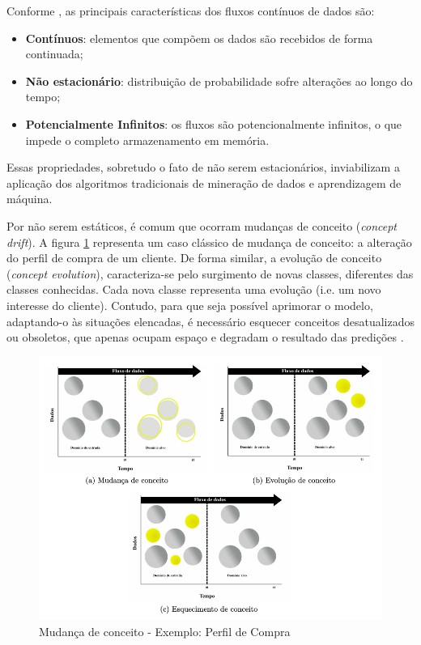 \documentclass[qual, classic, a4paper]{ufbathesis}
\begin{document}
Conforme \cite{Gama:2014:survey}, as principais características dos fluxos contínuos de dados são:

\begin{itemize}
    \item \textbf{Contínuos}: elementos que compõem os dados são recebidos de forma continuada;

    \item \textbf{Não estacionário}: distribuição de probabilidade sofre alterações ao longo do tempo;

    \item \textbf{Potencialmente Infinitos}: os fluxos são potencionalmente infinitos, o que impede o completo armazenamento em memória.
\end{itemize}

Essas propriedades, sobretudo o fato de não serem estacionários, inviabilizam a aplicação dos algoritmos tradicionais de mineração de dados e aprendizagem de máquina.

Por não serem estáticos, é comum que ocorram mudanças de conceito (\textit{concept drift}). A figura \ref{fig1} representa um caso clássico de mudança de conceito: a alteração do perfil de compra de um cliente.
De forma similar, a evolução de conceito (\textit{concept evolution}), caracteriza-se pelo surgimento de novas classes, diferentes das classes conhecidas. Cada nova classe representa uma evolução (i.e. um novo interesse do cliente). Contudo, para que seja possível aprimorar o modelo, adaptando-o às situações elencadas, é necessário esquecer conceitos desatualizados ou obsoletos, que apenas ocupam espaço e degradam o resultado das predições \cite{Abdallah}.

\begin{figure}[ht!]
    \begin{center}
      \includegraphics[scale=0.6]{001.png}
    \caption{Mudança de conceito - Exemplo: Perfil de Compra}
    \label{fig1}
    \end{center}
\end{figure}
\end{document}
